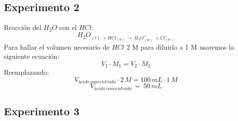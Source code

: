 \documentclass[../main.tex]{subfiles}
\begin{document}
\subsection{Experimento 2}

Reacción del $H_2O$ con el $HCl$:
\[H_2O_{(l) \: + HCl_{(ac)} \rightarrow \: H_3O^+_{(ac)} \: + Cl^-_{(ac)}} \]
Para hallar el volumen necesario de $HCl$ 2 M para diluirlo a 1 M
usaremos la siguiente ecuación:
\[
    V_1\cdot M_1 = V_2\cdot M_2
\]
Reemplazando:
\[V_{ácido\:concentrado}\cdot 2\,M = 100\,mL\cdot1\,M\]
\[V_{ácido\:concentrado}\,=\,50\,mL \]

\subsection{Experimento 3}
\end{document}
